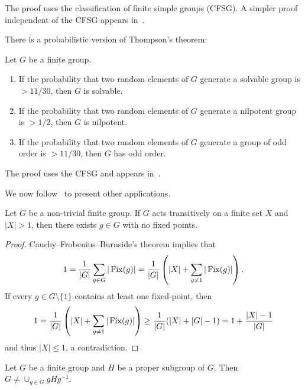 The proof uses the classification of finite simple groups (CFSG). A simpler
proof independent of the CFSG appears in~\cite{MR1346207}.

There is a probabilistic version of Thompson's theorem:

\begin{theorem}
    Let $G$ be a finite group.
    \begin{enumerate}
        \item If the probability that two random elements of $G$ 
        generate a solvable group is $>11/30$, then $G$ is solvable. 
        \item If the probability that two random elements of $G$ 
        generate a nilpotent group is $>1/2$, then $G$ is nilpotent.
        \item If the probability that two random elements of $G$ 
        generate a group of odd order is $>11/30$, then $G$ has odd order.
    \end{enumerate}
\end{theorem}

The proof uses the CFSG and appears in~\cite{MR1770615}.


We now follow~\cite{MR1997347} to present other applications. 

\begin{theorem}[Jordan]
    Let $G$ be a non-trivial finite group. If $G$ acts transitively 
    on a finite set $X$ and $|X|>1$, then there exists 
    $g\in G$ with no fixed points.
\end{theorem}

\begin{proof}
    Cauchy--Frobenius--Burnside's theorem implies that
    \[
    1=\frac{1}{|G|}\sum_{g\in G}|\operatorname{Fix}(g)|=\frac{1}{|G|}\left(|X|+\sum_{g\ne 1}|\operatorname{Fix}(g)|\right).
    \]
    If every $g\in G\setminus\{1\}$ contains at least one fixed-point, then
    \[
    1=\frac{1}{|G|}\left(|X|+\sum_{g\ne 1}|\operatorname{Fix}(g)|\right)\geq \frac{1}{|G|}(|X|+|G|-1)=1+\frac{|X|-1}{|G|}
    \]
    and thus $|X|\leq1$, a contradiction. 
\end{proof}

\begin{corollary}
    Let $G$ be a finite group and $H$ be a proper subgroup of $G$. 
    Then $G\ne\cup_{g\in G}gHg^{-1}$.
\end{corollary}


